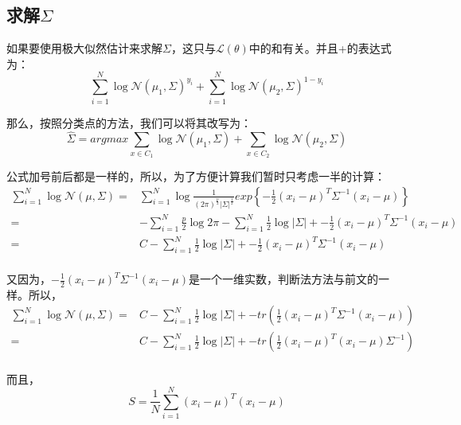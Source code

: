 \documentclass[a4paper]{article}
\begin{document}
\subsection{求解$\Sigma$}
如果要使用极大似然估计来求解$\Sigma$，这只与$\mathcal{L}(\theta)$中的和有关。并且+的表达式为：
\begin{equation}
    \sum_{i=1}^N \log \mathcal{N}(\mu_1, \Sigma)^{y_i} + \sum_{i=1}^N \log \mathcal{N}(\mu_2, \Sigma)^{1-y_i}
\end{equation}

那么，按照分类点的方法，我们可以将其改写为：
\begin{equation}
    \hat{\Sigma} = argmax \sum_{x\in C_1} \log \mathcal{N}(\mu_1, \Sigma) + \sum_{x\in C_2} \log \mathcal{N}(\mu_2, \Sigma)
\end{equation}

公式加号前后都是一样的，所以，为了方便计算我们暂时只考虑一半的计算：
\begin{equation}
    \begin{split}
        \sum_{i=1}^N \log \mathcal{N}(\mu, \Sigma) 
        = & \sum_{i=1}^N\log \frac{1}{(2\pi)^{\frac{p}{2}}|\Sigma|^{\frac{1}{2}}}exp\left\{ -\frac{1}{2}(x_i-\mu)^T\Sigma^{-1}(x_i-\mu) \right\} \\
        = & - \sum_{i=1}^N \frac{p}{2} \log 2\pi - \sum_{i=1}^N \frac{1}{2} \log |\Sigma| + -\frac{1}{2}(x_i-\mu)^T\Sigma^{-1}(x_i-\mu) \\
        = & C - \sum_{i=1}^N \frac{1}{2} \log |\Sigma| + -\frac{1}{2}(x_i-\mu)^T\Sigma^{-1}(x_i-\mu) \\ 
    \end{split}
\end{equation}

又因为，$-\frac{1}{2}(x_i-\mu)^T\Sigma^{-1}(x_i-\mu)$是一个一维实数，判断法方法与前文的一样。所以，
\begin{equation}
    \begin{split}
        \sum_{i=1}^N \log \mathcal{N}(\mu, \Sigma) 
        = & C - \sum_{i=1}^N \frac{1}{2} \log |\Sigma| + -tr\left(\frac{1}{2}(x_i-\mu)^T\Sigma^{-1}(x_i-\mu)\right) \\
        = & C - \sum_{i=1}^N \frac{1}{2} \log |\Sigma| + -tr\left(\frac{1}{2}(x_i-\mu)^T(x_i-\mu)\Sigma^{-1} \right) \\
    \end{split}
\end{equation}

而且，
\begin{equation}
    S = \frac{1}{N}\sum_{i=1}^{N} (x_i-\mu)^T(x_i-\mu)
\end{equation}
\end{document}

